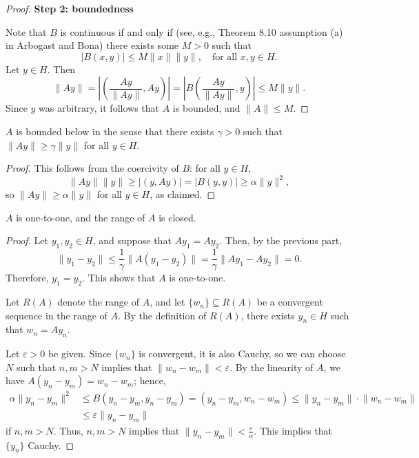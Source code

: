 \documentclass{homework}
\begin{document}
\begin{arabicparts}
\begin{proof}
			\textbf{Step 2: boundedness}
			
			Note that $B$ is continuous if and only if (see, e.g., Theorem 8.10 assumption (a) in Arbogast and Bona) there exists some $M > 0$ such that
			\begin{equation}
				|B(x,y)| \le M\lVert x\rVert \lVert y\rVert, \quad \text{for all } x, y\in H.
			\end{equation}
			Let $y \in H$. Then
			\begin{equation}
				\lVert Ay\rVert = \left|\left(\frac{Ay}{\lVert Ay\rVert}, Ay\right)\right|=\left|B\left(\frac{Ay}{\lVert Ay\rVert},y \right)\right| \le M \lVert y\rVert.
			\end{equation}
			Since $y$ was arbitrary, it follows that $A$ is bounded, and $\lVert A \rVert \le M$.
		\end{proof}
		
		\questionpart
		$A$ is bounded below in the sense that there exists $\gamma > 0$ such that $\lVert A y\rVert \ge \gamma \lVert y\rVert$ for all $y \in H$.
		\begin{proof}
			This follows from the coercivity of $B$: for all $y \in H$,
			\begin{equation}
				\lVert Ay\rVert \lVert y\rVert \ge |(y, Ay)| = |B(y, y)| \ge \alpha \lVert y \rVert^2,
			\end{equation}
			so $\lVert Ay\rVert \ge \alpha \lVert y\rVert$ for all $y \in H$, as claimed.
		\end{proof}
		
		\questionpart
		$A$ is one-to-one, and the range of $A$ is closed.
		\begin{proof}
			Let $y_1, y_2 \in H$, and suppose that $Ay_1 = Ay_2$. Then, by the previous part,
			\begin{equation}
				\lVert y_1 - y_2\rVert \le \frac{1}{\gamma}\lVert A(y_1 - y_2)\rVert = \frac{1}{\gamma}\lVert Ay_1 - Ay_2\rVert = 0.
			\end{equation}
			Therefore, $y_1 = y_2$. This shows that $A$ is one-to-one.
			
			Let $R(A)$ denote the range of $A$, and let $\{w_n\} \subseteq R(A)$ be a convergent sequence in the range of $A$. By the definition of $R(A)$, there exists $y_n \in H$ such that $w_n = Ay_n$.
			
			Let $\varepsilon > 0$ be given. Since $\{w_n\}$ is convergent, it is also Cauchy, so we can choose $N$ such that $n,m > N$ implies that $\lVert w_n - w_m\rVert < \varepsilon$. By the linearity of $A$, we have $A(y_n-y_m) = w_n-w_m$; hence,
			\begin{align}
				\alpha \lVert y_n-y_m\rVert^2 &\le B(y_n-y_m,y_n-y_m) = (y_n-y_m,w_n-w_m)\le \lVert y_n-y_m\rVert\cdot \lVert w_n - w_m\rVert \\
				&\le \varepsilon\lVert y_n-y_m\rVert
			\end{align}
			if $n,m > N$. Thus, $n,m >N$ implies that $\lVert y_n - y_m\rVert < \frac{\varepsilon}{\alpha}$. This implies that  $\{y_n\}$ Cauchy.
			

\end{proof}
\end{arabicparts}
\end{document}
